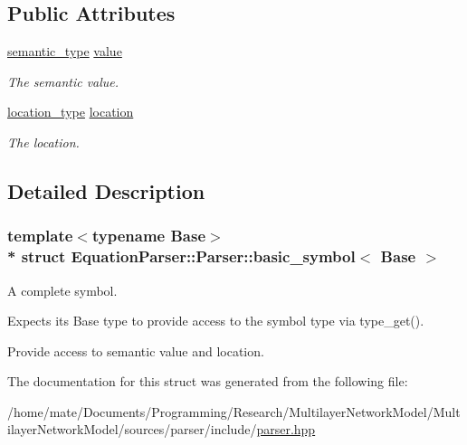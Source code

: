 \subsection*{Public Attributes}
\begin{DoxyCompactItemize}
\item 
\hyperlink{classEquationParser_1_1Parser_a86482685d5f3d44fff68fd4150bbd2dd}{semantic\+\_\+type} \hyperlink{structEquationParser_1_1Parser_1_1basic__symbol_af1042675e7012ce74eb1c18963c2ecd8}{value}\hypertarget{structEquationParser_1_1Parser_1_1basic__symbol_af1042675e7012ce74eb1c18963c2ecd8}{}\label{structEquationParser_1_1Parser_1_1basic__symbol_af1042675e7012ce74eb1c18963c2ecd8}

\begin{DoxyCompactList}\small\item\em The semantic value. \end{DoxyCompactList}\item 
\hyperlink{classEquationParser_1_1Parser_a9c08ca33906dfb521b4ec5989e3620bf}{location\+\_\+type} \hyperlink{structEquationParser_1_1Parser_1_1basic__symbol_a0c1ce0a22bce2efd038930916a006243}{location}\hypertarget{structEquationParser_1_1Parser_1_1basic__symbol_a0c1ce0a22bce2efd038930916a006243}{}\label{structEquationParser_1_1Parser_1_1basic__symbol_a0c1ce0a22bce2efd038930916a006243}

\begin{DoxyCompactList}\small\item\em The location. \end{DoxyCompactList}\end{DoxyCompactItemize}


\subsection{Detailed Description}
\subsubsection*{template$<$typename Base$>$\\*
struct Equation\+Parser\+::\+Parser\+::basic\+\_\+symbol$<$ Base $>$}

A complete symbol.

Expects its Base type to provide access to the symbol type via type\+\_\+get().

Provide access to semantic value and location. 

The documentation for this struct was generated from the following file\+:\begin{DoxyCompactItemize}
\item 
/home/mate/\+Documents/\+Programming/\+Research/\+Multilayer\+Network\+Model/\+Multilayer\+Network\+Model/sources/parser/include/\hyperlink{parser_8hpp}{parser.\+hpp}\end{DoxyCompactItemize}
